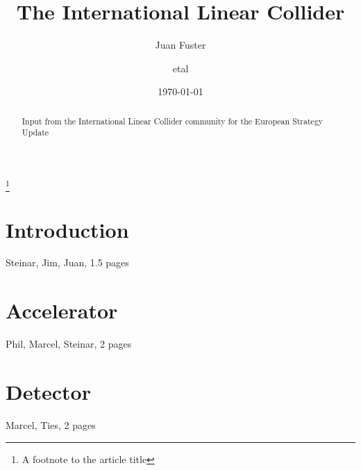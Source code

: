 \documentclass[%
 reprint,
 amsmath,amssymb,
 aps,
]{revtex4-1}
\begin{document}

\title{The International Linear Collider}%
\thanks{A footnote to the article title}%

\author{Juan Fuster}
\author{etal}%
%


\date{\today}%

\begin{abstract}
Input from the International Linear Collider community for the European Strategy Update 

\end{abstract}

\maketitle


\section{\label{sec:intro}Introduction}

Steinar, Jim, Juan, 1.5 pages

\section{\label{sec:acc}Accelerator}

Phil, Marcel, Steinar, 2 pages

\section{\label{sec:det}Detector}
Marcel, Ties, 2 pages
\end{document}
